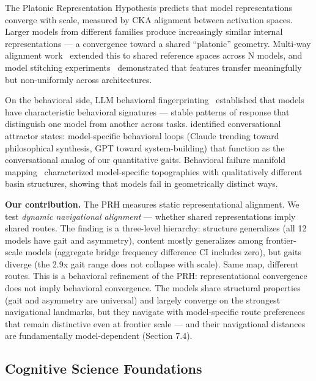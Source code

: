 The Platonic Representation Hypothesis \citep{huh2024platonic} predicts that model representations converge with scale, measured by CKA alignment between activation spaces. Larger models from different families produce increasingly similar internal representations --- a convergence toward a shared ``platonic'' geometry. Multi-way alignment work~\citep{multiwayalignment2026} extended this to shared reference spaces across N models, and model stitching experiments~\citep{modelstitching2025} demonstrated that features transfer meaningfully but non-uniformly across architectures.

On the behavioral side, LLM behavioral fingerprinting~\citep{behavioralfingerprint2025} established that models have characteristic behavioral signatures --- stable patterns of response that distinguish one model from another across tasks. \citet{nanda2026attractors} identified conversational attractor states: model-specific behavioral loops (Claude trending toward philosophical synthesis, GPT toward system-building) that function as the conversational analog of our quantitative gaits. Behavioral failure manifold mapping~\citep{failuremanifold2025} characterized model-specific topographies with qualitatively different basin structures, showing that models fail in geometrically distinct ways.

\textbf{Our contribution.} The PRH measures static representational alignment. We test \emph{dynamic navigational alignment} --- whether shared representations imply shared routes. The finding is a three-level hierarchy: structure generalizes (all 12 models have gait and asymmetry), content mostly generalizes among frontier-scale models (aggregate bridge frequency difference CI includes zero), but gaits diverge (the 2.9x gait range does not collapse with scale). Same map, different routes. This is a behavioral refinement of the PRH: representational convergence does not imply behavioral convergence. The models share structural properties (gait and asymmetry are universal) and largely converge on the strongest navigational landmarks, but they navigate with model-specific route preferences that remain distinctive even at frontier scale --- and their navigational distances are fundamentally model-dependent (Section 7.4).

\subsection{Cognitive Science Foundations}\label{cognitive-science-foundations}


